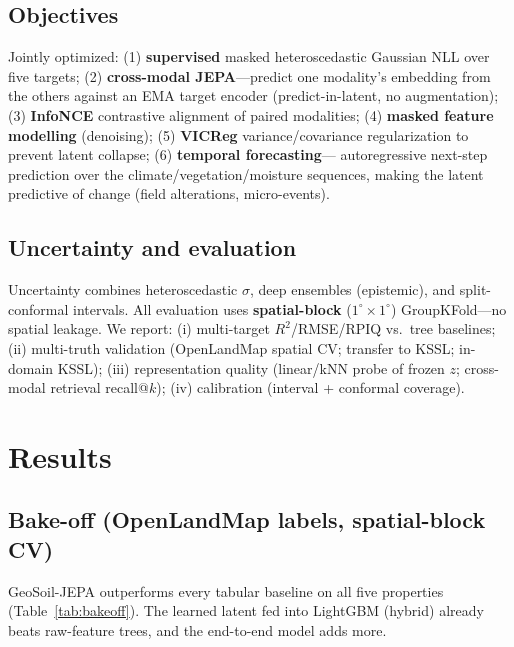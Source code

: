 \documentclass[11pt]{article}
\begin{document}
\subsection{Objectives}
Jointly optimized: (1) \textbf{supervised} masked heteroscedastic Gaussian NLL over
five targets; (2) \textbf{cross-modal JEPA}---predict one modality's embedding from
the others against an EMA target encoder (predict-in-latent, no augmentation);
(3) \textbf{InfoNCE} contrastive alignment of paired modalities; (4) \textbf{masked
feature modelling} (denoising); (5) \textbf{VICReg} variance/covariance
regularization to prevent latent collapse; (6) \textbf{temporal forecasting}---
autoregressive next-step prediction over the climate/vegetation/moisture sequences,
making the latent predictive of change (field alterations, micro-events).

\subsection{Uncertainty and evaluation}
Uncertainty combines heteroscedastic $\sigma$, deep ensembles (epistemic), and
split-conformal intervals. All evaluation uses \textbf{spatial-block} ($1^\circ\times
1^\circ$) GroupKFold---no spatial leakage. We report: (i) multi-target $R^2$/RMSE/RPIQ
vs.\ tree baselines; (ii) multi-truth validation (OpenLandMap spatial CV; transfer to
KSSL; in-domain KSSL); (iii) representation quality (linear/kNN probe of frozen $z$;
cross-modal retrieval recall@$k$); (iv) calibration (interval + conformal coverage).

\section{Results}
\subsection{Bake-off (OpenLandMap labels, spatial-block CV)}
GeoSoil-JEPA outperforms every tabular baseline on all five properties
(Table~\ref{tab:bakeoff}). The learned latent fed into LightGBM (hybrid) already
beats raw-feature trees, and the end-to-end model adds more.
\end{document}
